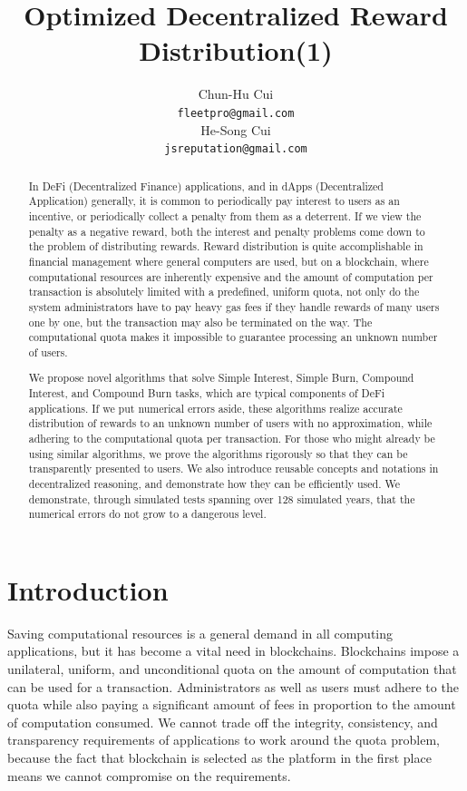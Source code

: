\documentclass{article}
\title{Optimized Decentralized Reward Distribution(1)}
\author{
  Chun-Hu Cui\\
  \texttt{fleetpro@gmail.com} \\
   \And
  He-Song Cui\\
  \texttt{jsreputation@gmail.com} \\
}
\begin{document}
\onehalfspacing

\maketitle


\begin{abstract}
  In DeFi (Decentralized Finance) applications, and in dApps (Decentralized Application) 
  generally, it is common to periodically pay interest to users as an 
  incentive, or periodically collect a penalty from them as a deterrent. 
  If we view the penalty as a negative reward, both the interest and penalty problems 
  come down to the problem of 
  distributing rewards. Reward distribution is quite accomplishable in financial 
  management where general computers are used, 
  but on a blockchain, where computational resources are inherently expensive 
  and the amount of computation per transaction is absolutely limited with a predefined, 
  uniform quota, not only do the system administrators have to pay heavy gas fees 
  if they handle rewards of many users one by one, but the transaction may also be 
  terminated on the way. 
  The computational quota makes it impossible 
  to guarantee processing an unknown number of users.

  We propose novel algorithms that solve Simple Interest, Simple Burn, Compound Interest, 
  and Compound Burn tasks, which are typical components of DeFi applications. 
  If we put numerical errors aside, these algorithms realize accurate distribution of 
  rewards to an unknown number of users with no approximation, 
  while adhering to the computational quota per transaction.
    For those who might already be using similar algorithms, 
  we prove the algorithms rigorously so that they can be 
  transparently presented to users.
  We also introduce reusable concepts and notations in decentralized reasoning,
  and demonstrate how they can be efficiently used.
  We demonstrate, through simulated tests spanning over 128 simulated years, 
  that the numerical errors do not grow to a dangerous level.

\end{abstract}


\section{Introduction}
Saving computational resources is a general demand in all computing applications, 
but it has become a vital need in blockchains.
Blockchains impose a unilateral, uniform, and unconditional quota on the amount of 
computation that can be used for a transaction. 
Administrators as well as users must adhere to the quota while also paying 
a significant amount of fees in proportion to the amount of computation consumed.
We cannot trade off the integrity, consistency, and transparency requirements 
of applications to work around the quota problem, because the fact that blockchain is 
selected as the platform in the first place means we cannot compromise on the requirements.
\end{document}
